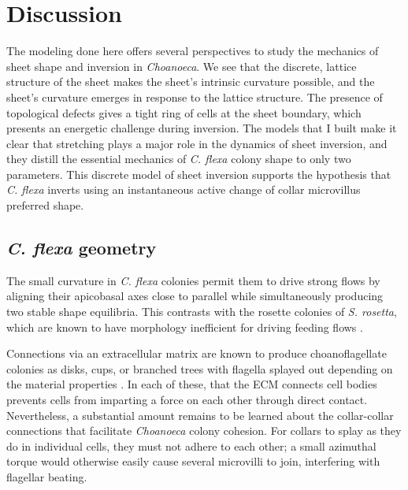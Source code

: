 
\chapter{Discussion} %

\ifpdf
    \graphicspath{{Chapter4/Figs/Raster/}{Chapter4/Figs/PDF/}{Chapter4/Figs/}}
\else
    \graphicspath{{Chapter4/Figs/Vector/}{Chapter4/Figs/}}
\fi

The modeling done here offers several perspectives to study the mechanics of sheet shape and inversion in \textit{Choanoeca}. 
We see that the discrete, lattice structure of the sheet makes the sheet's intrinsic curvature possible, and the sheet's curvature emerges in response to the lattice structure.
The presence of topological defects gives a tight ring of cells at the sheet boundary, which presents an energetic challenge during inversion.
The models that I built make it clear that stretching plays a major role in the dynamics of sheet inversion, and they distill the essential mechanics of \textit{C. flexa} colony shape to only two parameters.
This discrete model of sheet inversion supports the hypothesis that \textit{C. flexa} inverts using an instantaneous active change of collar microvillus preferred shape.

\section{\textit{C. flexa} geometry} 

The small curvature in \textit{C. flexa} colonies permit them to drive strong flows by aligning their apicobasal axes close to parallel while simultaneously producing two stable shape equilibria.
This contrasts with the rosette colonies of \textit{S. rosetta}, which are known to have morphology inefficient for driving feeding flows \citep{kirkegaard2016}.

Connections via an extracellular matrix are known to produce choanoflagellate colonies as disks, cups, or branched trees with flagella splayed out depending on the material properties \citep{larson2020}.
In each of these, that the ECM connects cell bodies prevents cells from imparting a force on each other through direct contact.
Nevertheless, a substantial amount remains to be learned about the collar-collar connections that facilitate \textit{Choanoeca} colony cohesion.
For collars to splay as they do in individual cells, they must not adhere to each other; a small azimuthal torque would otherwise easily cause several microvilli to join, interfering with flagellar beating.

